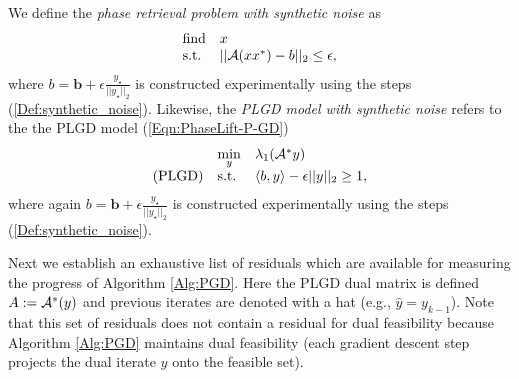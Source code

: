 We define the \textit{phase retrieval problem with synthetic noise} as
\begin{equation} \label{Eqn:phase_retrieval_synthetic_noise}
\begin{array}{ll}
		\text{find}
		&	x
			\\
		\textnormal{s.t.}
		& 	||{\mathcal A} (xx^*) - b||_2 \leq \epsilon,
\end{array}
\end{equation}
where $b = \mathbf{b} + \epsilon \frac{y_\star}{|| y_\star ||_2}$ is constructed experimentally using the steps (\ref{Def:synthetic_noise}).  Likewise, the \textit{PLGD model with synthetic noise} refers to the the PLGD model (\ref{Eqn:PhaseLift-P-GD}) 
\begin{equation} 			\label{Eqn:PhaseLift-GD_synthetic_noise}
\begin{array}{lll}
	&\min\limits_{\substack{y}}
					&	\lambda_1({\mathcal A}^* y)
						\\
	\textnormal{(PLGD)}
				&	\textnormal{s.t.}
					&	\langle b, y \rangle - \epsilon ||y||_2 \geq 1,
\end{array}
\end{equation}
where again $b = \mathbf{b} + \epsilon \frac{y_\star}{|| y_\star ||_2}$ is constructed experimentally using the steps (\ref{Def:synthetic_noise}).  











Next we establish an exhaustive list of residuals which are available for measuring the progress of Algorithm \ref{Alg:PGD}.  Here the PLGD dual matrix is defined $A:= {\mathcal A}^*(y)$ and previous iterates are denoted with a hat (e.g., $ \hat{y} = y_{k-1} $).  Note that this set of residuals does not contain a residual for dual feasibility because Algorithm \ref{Alg:PGD} maintains dual feasibility (each gradient descent step projects the dual iterate $y$ onto the feasible set).


